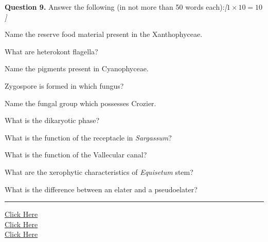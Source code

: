 \documentclass[11pt,a4paper]{article}
\newcommand{\pts}[1]{\hfill   \textit{[#1]}}
\begin{document}
\noindent   \textbf{Question 9.} Answer the following (in not more than 50 words each):\pts{$1  \times 10 = 10$}

\begin{parts}
  \item Name the reserve food material present in the Xanthophyceae.
  \item What are heterokont flagella?
  \item Name the pigments present in Cyanophyceae.
  \item Zygospore is formed in which fungus?
  \item Name the fungal group which possesses Crozier.
  \item What is the dikaryotic phase?
  \item What is the function of the receptacle in   \textit{Sargassum}?
  \item What is the function of the Vallecular canal?
  \item What are the xerophytic characteristics of   \textit{Equisetum} stem?
  \item What is the difference between an elater and a pseudoelater?
\end{parts}

\vfill
\rule{\linewidth}{0.4pt}

\begin{center}\small
\href{https://bhu-exam.vercel.app/}{Click Here}\\[4pt]\href{https://me-aryan.vercel.app/}{Click Here}\\[4pt]\href{https://quashan-me.vercel.app/}{Click Here}
\end{center}
\end{document}
